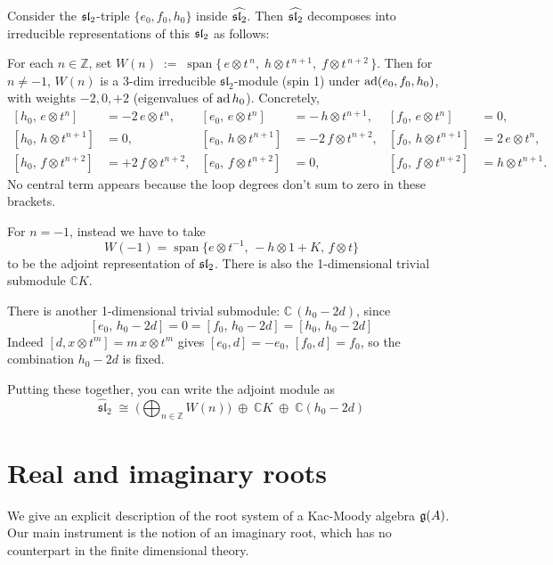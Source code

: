 \documentclass[12pt]{article}
\begin{document}
\begin{example}
     Consider the $\sl_2$-triple $\{e_0,f_0,h_0\}$ inside $\widehat{\sl_2}$. Then $\widehat{\sl_2}$ decomposes into irreducible representations of this $\sl_2$ as follows:

    For each $n\in\mathbb{Z}$, set
    $W(n)\;:=\;\operatorname{span}\{\,e\otimes t^{\,n},\;h\otimes t^{\,n+1},\;f\otimes t^{\,n+2}\,\}$.
    Then for $n\neq -1$, $W(n)$ is a 3-dim irreducible $\mathfrak{sl}_2$-module (spin 1) under $\ad(e_0,f_0,h_0)$, with weights $-2,0,+2$ (eigenvalues of $\ad h_0$). Concretely,
    \[
        \begin{aligned}
            [h_0,\,e\otimes t^n]     & =-2\,e\otimes t^n,     & [e_0,\,e\otimes t^n]     & =-\,h\otimes t^{n+1},  & [f_0,\,e\otimes t^n]     & =0,                 \\
            [h_0,\,h\otimes t^{n+1}] & =0,                    & [e_0,\,h\otimes t^{n+1}] & =-2\,f\otimes t^{n+2}, & [f_0,\,h\otimes t^{n+1}] & =2\,e\otimes t^{n}, \\
            [h_0,\,f\otimes t^{n+2}] & =+2\,f\otimes t^{n+2}, & [e_0,\,f\otimes t^{n+2}] & =0,                    & [f_0,\,f\otimes t^{n+2}] & =h\otimes t^{n+1}.
        \end{aligned}
    \]
    No central term appears because the loop degrees don't sum to zero in these brackets.

    For $n=-1$, instead we have to take \[W(-1)=\operatorname{span}\{e\otimes t^{-1},\, -h\otimes 1 + K,\,f\otimes t\}\] to be the adjoint representation of $\sl_2$. There is also the 1-dimensional trivial submodule $\mathbb{C}K$.

    There is another 1-dimensional trivial submodule:
    $\mathbb{C}\,(h_0-2d)$,
    since \[[e_0,\,h_0-2d]=0=[f_0,\,h_0-2d]=[h_0,\,h_0-2d]\]
    Indeed $[d, x\otimes t^m]=m\,x\otimes t^m$ gives $[e_0,d]=-e_0$, $[f_0,d]=f_0$, so the combination $h_0-2d$ is fixed.

    Putting these together, you can write the adjoint module as
    \[
        \widehat{\mathfrak{sl}}_2
        \;\cong\;
        \Big(\bigoplus_{n\in\mathbb{Z}} W(n)\Big)
        \;\oplus\; \mathbb{C}K
        \;\oplus\; \mathbb{C}(h_0-2d)\]
\end{example}

\section{Real and imaginary roots}
We give an explicit description of the root system of a Kac-Moody algebra $\mf g(A)$. Our main instrument is the notion of an imaginary root, which has no counterpart in the finite dimensional theory.
\end{document}
